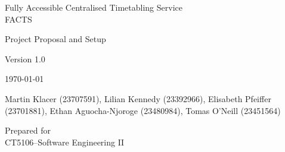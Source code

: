 \documentclass[12pt, a4paper]{article}
\begin{document}
\begin{titlepage}
    \centering
    \vspace*{4cm}
    {\Large Fully Accessible Centralised Timetabling Service\\FACTS \par}
    \vspace{2cm}
    {\Large Project Proposal and Setup \par}
    \vspace{0.5cm}
    {\Large Version 1.0 \par}
    \vspace{0.5cm}
    {\Large \today \par}
    \vspace{2cm}
    {\Large Martin Klacer (23707591), Lilian Kennedy (23392966), Elisabeth Pfeiffer (23701881), Ethan Aguocha-Njoroge (23480984), Tomas O'Neill (23451564)\par}
    \vfill

    Prepared for\\
    CT5106--Software Engineering II\par

\end{titlepage}

\newpage








\end{document}

